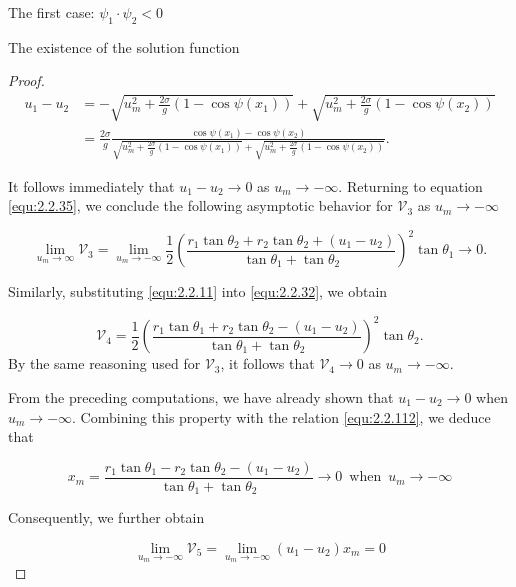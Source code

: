 \documentclass[letterpaper,reqno,10pt,twoside]{amsart}
\theoremstyle{definition}
\theoremstyle{remark}
\begin{document}
\begin{section}{The first case: $\psi_1\cdot \psi_2<0$ }
\begin{subsection}{The existence of the solution function}
\begin{proof}
        \begin{align*}
             u_1-u_2&=-\sqrt{u_{m}^{2}+\frac{2\sigma}{g}(1-\cos\psi(x_1))}+\sqrt{u_m^{2}+\frac{2\sigma}{g}(1-\cos\psi(x_2))}\\
              &=\frac{2\sigma}{g}\frac{\cos\psi(x_1)-\cos\psi(x_2)}{\sqrt{u_{m}^{2}+\frac{2\sigma}{g}(1-\cos\psi(x_1))}+\sqrt{u_m^{2}+\frac{2\sigma}{g}(1-\cos\psi(x_2))}}.
        \end{align*}
    
        \noindent It follows immediately that $u_1-u_2 \to 0$ as $u_m \to -\infty$. Returning to equation \eqref{equ:2.2.35}, we conclude the following asymptotic behavior for $\mathscr{V}_{3}$ as $u_{m}\rightarrow -\infty$

        \begin{equation*}
           \lim_{u_m\rightarrow \infty} \mathscr{V}_{3}=\lim_{u_{m}\rightarrow -\infty}\frac{1}{2}(\frac{r_1\tan\theta_2+r_2\tan\theta_2+(u_1-u_2)}{\tan\theta_1+\tan\theta_{2}})^{2}\tan\theta_1\rightarrow 0.
        \end{equation*}

         Similarly, substituting \eqref{equ:2.2.11} into \eqref{equ:2.2.32}, we obtain 

        \begin{equation*}
            \mathscr{V}_{4}=\frac{1}{2}(\frac{r_1\tan\theta_1+r_2\tan\theta_{2}-(u_1-u_2)}{\tan\theta_1+\tan\theta_2})^{2}\tan\theta_2.
       \end{equation*} 
     By the same reasoning used for $\mathscr{V}_{3}$, it follows that $\mathscr{V}_{4}\rightarrow 0$ as $u_{m}\rightarrow -\infty$.

        From the preceding computations, we have already shown that $u_1-u_2\rightarrow 0$ when $u_{m}\rightarrow -\infty$.  Combining this property with the relation \eqref{equ:2.2.112}, we deduce that

        \begin{equation*}
            x_{m}=\frac{r_1\tan\theta_1-r_2\tan\theta_2-(u_1-u_2)}{\tan\theta_1+\tan\theta_2}\rightarrow 0~\operatorname{when}~u_{m}\rightarrow -\infty
        \end{equation*}

        \noindent Consequently, we further obtain

        \begin{equation*}
            \lim_{u_{m}\rightarrow -\infty}\mathscr{V}_{5}=\lim_{u_{m}\rightarrow -\infty}(u_1-u_2)x_{m}=0
        \end{equation*}


\end{proof}
\end{subsection}
\end{section}
\end{document}
